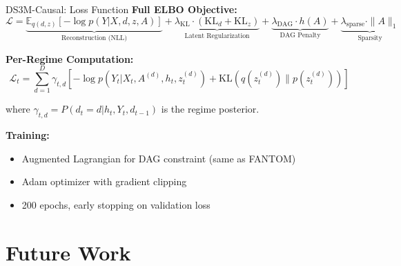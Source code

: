 \documentclass[aspectratio=169]{beamer}
\begin{document}
\begin{frame}{DS3M-Causal: Loss Function}
\textbf{Full ELBO Objective:}
\begin{equation*}
\mathcal{L} = \underbrace{\mathbb{E}_{q(d,z)}[-\log p(Y|X,d,z,A)]}_{\text{Reconstruction (NLL)}} + \underbrace{\lambda_{\text{KL}} \cdot (\text{KL}_d + \text{KL}_z)}_{\text{Latent Regularization}} + \underbrace{\lambda_{\text{DAG}} \cdot h(A)}_{\text{DAG Penalty}} + \underbrace{\lambda_{\text{sparse}} \cdot \|A\|_1}_{\text{Sparsity}}
\end{equation*}

\vspace{0.3cm}
\textbf{Per-Regime Computation:}
\begin{equation*}
\mathcal{L}_t = \sum_{d=1}^{D} \gamma_{t,d} \left[ -\log p(Y_t | X_t, A^{(d)}, h_t, z_t^{(d)}) + \text{KL}(q(z_t^{(d)}) \| p(z_t^{(d)})) \right]
\end{equation*}

where $\gamma_{t,d} = P(d_t = d | h_t, Y_t, d_{t-1})$ is the regime posterior.

\vspace{0.3cm}
\textbf{Training:}
\begin{itemize}
    \item Augmented Lagrangian for DAG constraint (same as FANTOM)
    \item Adam optimizer with gradient clipping
    \item 200 epochs, early stopping on validation loss
\end{itemize}
\end{frame}

\section{Future Work}
\end{document}
